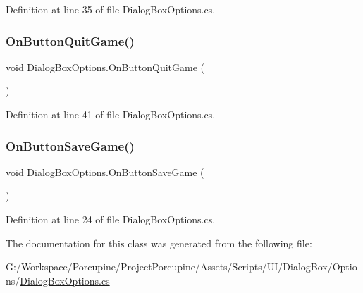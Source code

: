 Definition at line 35 of file Dialog\+Box\+Options.\+cs.

\mbox{\label{class_dialog_box_options_aee33fe855a444d8e336beafb716df107}} 
\subsubsection{\texorpdfstring{On\+Button\+Quit\+Game()}{OnButtonQuitGame()}}
{\footnotesize\ttfamily void Dialog\+Box\+Options.\+On\+Button\+Quit\+Game (\begin{DoxyParamCaption}{ }\end{DoxyParamCaption})}



Definition at line 41 of file Dialog\+Box\+Options.\+cs.

\mbox{\label{class_dialog_box_options_ae4b55c39f8177625ca69e08b490ecea3}} 
\subsubsection{\texorpdfstring{On\+Button\+Save\+Game()}{OnButtonSaveGame()}}
{\footnotesize\ttfamily void Dialog\+Box\+Options.\+On\+Button\+Save\+Game (\begin{DoxyParamCaption}{ }\end{DoxyParamCaption})}



Definition at line 24 of file Dialog\+Box\+Options.\+cs.



The documentation for this class was generated from the following file\+:\begin{DoxyCompactItemize}
\item 
G\+:/\+Workspace/\+Porcupine/\+Project\+Porcupine/\+Assets/\+Scripts/\+U\+I/\+Dialog\+Box/\+Options/\hyperlink{_dialog_box_options_8cs}{Dialog\+Box\+Options.\+cs}\end{DoxyCompactItemize}
